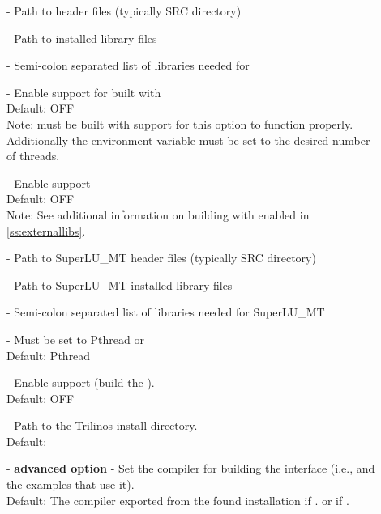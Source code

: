 \begin{description}
\item[] -
  Path to {\superludist} header files (typically SRC directory)
\item[] -
  Path to {\superludist} installed library files
\item[] -
  Semi-colon separated list of libraries needed for {\superludist}
\item[] -
  Enable {\sundials} support for {\superludist} built with {\openmp}
  \\
  Default: OFF
  \\
  Note: {\superludist} must be built with {\openmp} support for this option to function
  properly. Additionally the environment variable  must be set to
  the desired number of threads.
\item[] -
  Enable {\superlumt} support
  \\
  Default: OFF
  \\
  Note: See additional information on building with {\superlumt} enabled
  in \ref{ss:externallibs}.
\item[] -
  Path to SuperLU\_MT header files (typically SRC directory)
\item[] -
  Path to SuperLU\_MT installed library files
\item[] -
  Semi-colon separated list of libraries needed for SuperLU\_MT
\item[] -
  Must be set to Pthread or {\openmp}
  \\
  Default: Pthread
\item[] -
  Enable {\trilinos} support (build the {\tpetra} {\nvector}).
  \\
  Default: OFF
\item[] -
  Path to the Trilinos install directory.
  \\
  Default:
\item[] - \textbf{advanced option} -
  Set the {\CC} compiler for building the {\trilinos} interface
  (i.e., {\nvectrilinos} and the examples that use it).
  \\
  Default: The {\CC} compiler exported from the found {\trilinos} installation
  if .  or  if .
  \\

\end{description}
